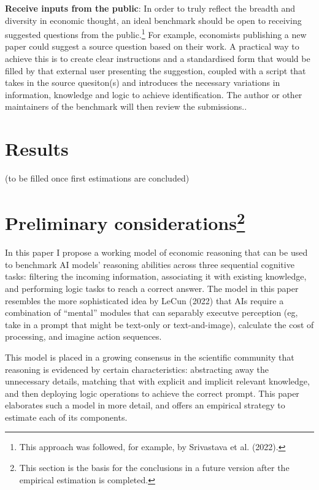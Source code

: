 \documentclass[
]{article}
\theoremstyle{plain}
\theoremstyle{definition}
\theoremstyle{remark}
\begin{document}
\textbf{Receive inputs from the public}: In order to truly reflect the
breadth and diversity in economic thought, an ideal benchmark should be
open to receiving suggested questions from the public.\footnote{This
  approach was followed, for example, by Srivastava et al. (2022).} For
example, economists publishing a new paper could suggest a source
question based on their work. A practical way to achieve this is to
create clear instructions and a standardised form that would be filled
by that external user presenting the suggestion, coupled with a script
that takes in the source quesiton(s) and introduces the necessary
variations in information, knowledge and logic to achieve
identification. The author or other maintainers of the benchmark will
then review the submissions..

\section{Results}\label{results}

(to be filled once first estimations are concluded)

\section[Preliminary considerations]{\texorpdfstring{Preliminary
considerations\footnote{This section is the basis for the conclusions in
  a future version after the empirical estimation is completed.}}{Preliminary considerations}}\label{preliminary-considerationsconcl}

In this paper I propose a working model of economic reasoning that can
be used to benchmark AI models' reasoning abilities across three
sequential cognitive tasks: filtering the incoming information,
associating it with existing knowledge, and performing logic tasks to
reach a correct answer. The model in this paper resembles the more
sophisticated idea by LeCun (2022) that AIs require a combination of
``mental'' modules that can separably executve perception (eg, take in a
prompt that might be text-only or text-and-image), calculate the cost of
processing, and imagine action sequences.

This model is placed in a growing consensus in the scientific community
that reasoning is evidenced by certain characteristics: abstracting away
the unnecessary details, matching that with explicit and implicit
relevant knowledge, and then deploying logic operations to achieve the
correct prompt. This paper elaborates such a model in more detail, and
offers an empirical strategy to estimate each of its components.
\end{document}
